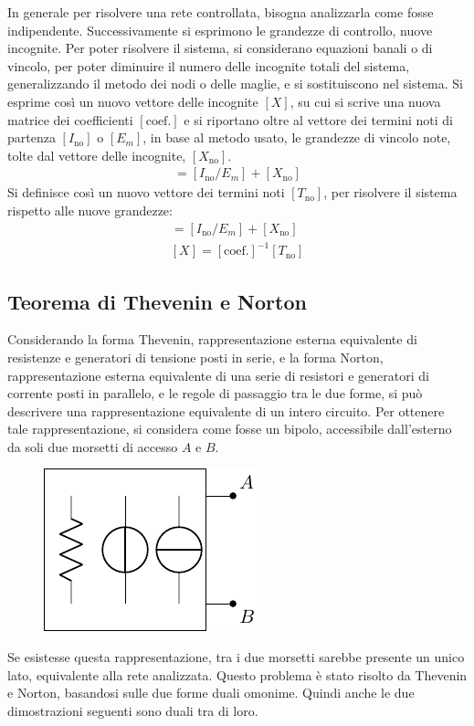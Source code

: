 \documentclass{article}
\numberwithin{equation}{subsection}
\begin{document}
In generale per risolvere una rete controllata, bisogna analizzarla come fosse indipendente. Successivamente si esprimono le grandezze di controllo, nuove 
incognite. Per poter risolvere il sistema, si considerano equazioni banali o di vincolo, per poter diminuire il numero delle incognite totali del sistema, generalizzando il 
metodo dei nodi o delle maglie, e si sostituiscono nel sistema. Si esprime così un nuovo vettore delle incognite $[X]$, su cui si scrive una nuova matrice 
dei coefficienti $[\mathrm{coef.}]$ e si riportano oltre al vettore dei termini noti di partenza $[I_\mathrm{no}]$ o $[E_m]$, in base al metodo usato, le grandezze di vincolo note, tolte dal 
vettore delle incognite, $[X_\mathrm{no}]$. 
\begin{gather*}
    [\mathrm{coef.}][X]=[I_\mathrm{no}/E_m]+[X_\mathrm{no}]
\end{gather*}
Si definisce così un nuovo vettore dei termini noti $[T_\mathrm{no}]$, per risolvere il sistema rispetto alle nuove grandezze:
\begin{gather*}
    [T_\mathrm{no}]=[I_\mathrm{no}/E_m]+[X_\mathrm{no}]\\
    [X]=[\mathrm{coef.}]^{-1}[T_\mathrm{no}]
\end{gather*}

\subsection{Teorema di Thevenin e Norton}

Considerando la forma Thevenin, rappresentazione esterna equivalente di resistenze e generatori di tensione posti in serie, e la forma Norton, rappresentazione 
esterna equivalente di una serie di resistori e generatori di corrente posti in parallelo, e le regole di passaggio tra le due forme, si può descrivere una rappresentazione 
equivalente di un intero circuito.  
Per ottenere tale rappresentazione, si considera come fosse un bipolo, accessibile dall'esterno da soli due morsetti di accesso $A$ e $B$.
\begin{figure}[H]%
    \centering
    \includegraphics{rete-adinamica-generica.pdf}%
    \label{fig:rete-adinamica-generica}
\end{figure}
Se esistesse questa rappresentazione, tra i due morsetti sarebbe presente un unico lato, equivalente alla rete analizzata. Questo problema è stato risolto da Thevenin e Norton, 
basandosi sulle due forme duali omonime. Quindi anche le due dimostrazioni seguenti sono duali tra di loro.
\end{document}

